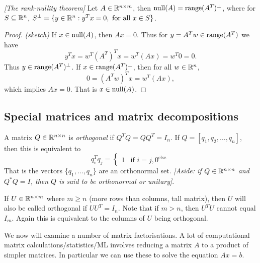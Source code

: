 \begin{thrm}
    \emph{[The rank-nullity theorem]} Let $A \in {\mathbb R}^{n \times m}$, then $\operatorname{null}(A) = \operatorname{range}(A^T)^\perp$, where for $S \subseteq {\mathbb R}^n$, $S^\perp = \{y \in {\mathbb R}^n : y^Tx = 0, \text{ for all } x \in S\}$.
\end{thrm}

\begin{proof}
    \emph{(sketch)} If $x \in \operatorname{null}(A)$, then $Ax = 0$. Thus for $y = A^Tw\in \operatorname{range}(A^T)$ we have 
    \[y^Tx= w^T(A^T)^Tx=w^T(Ax)=w^T0=0. \]
    Thus $y \in \operatorname{range}(A^T)^\perp$. If $x \in \operatorname{range}(A^T)^\perp$, then for all $w \in {\mathbb R}^n$,
    \[0 = (A^Tw)^Tx=w^T(Ax), \]
    which implies $Ax=0$. That is $x \in \operatorname{null}(A)$.
\end{proof}
\subsection{Special matrices and matrix decompositions}
\begin{defn}
    A matrix $Q \in {\mathbb R}^{n \times n}$ is \emph{orthogonal} if $Q^TQ = QQ^T = I_n$. If $Q =[q_1,q_2,\ldots,q_n]$, then this is equivalent to 
    \[q_i^Tq_j = \begin{cases}
        1 & \text{if } i = j,
        0 ^ \text{else.} 
    \end{cases}\]
    That is the vectors $\{q_1,\ldots, q_n\}$ are an orthonormal set. \emph{[Aside: if $Q \in {\mathbb R}^{n \times n}$ and $Q^*Q = I$, then $Q$ is said to be \emph{orthonormal} or \emph{unitary}]}. 
    
    If $U \in {\mathbb R}^{n \times m}$ where $m \ge n$ (more rows than columns, tall matrix), then $U$ will also be called orthogonal if $UU^T = I_n$. Note that if $m > n$, then $U^TU$ cannot equal $I_m$. Again this is equivalent to the columns of $U$ being orthogonal.
\end{defn}
We now will examine a number of matrix factorisations. A lot of computational matrix calculations/statistics/ML involves reducing a matrix $A$ to a product of simpler matrices. In particular we can use these to solve the equation $Ax =b $. 

